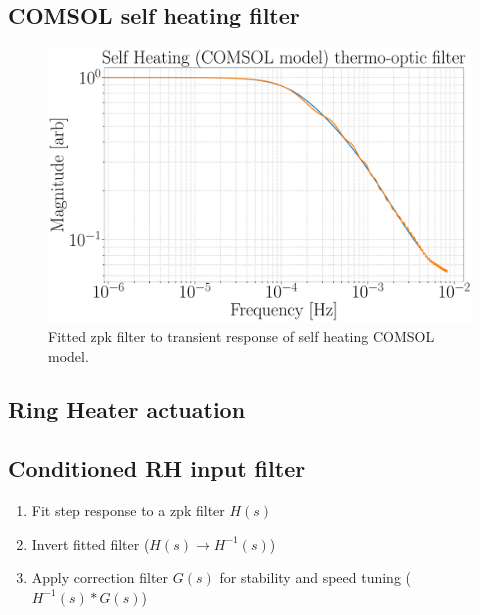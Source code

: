 \subsection{COMSOL self heating filter}
\begin{figure}[H]
\includegraphics[width=\textwidth]{figs/TCS/self_heating_zpk.pdf}
\caption{Fitted zpk filter to transient response of self heating COMSOL model.}
\label{fig:self_zpk_fit}
\end{figure}

\subsection{Ring Heater actuation}

\subsection{Conditioned RH input filter}
\begin{enumerate}	
	\item Fit step response to a zpk filter $H(s)$ 
	\item Invert fitted filter ($H(s) \rightarrow H^{-1}(s)$) 
	\item Apply correction filter $G(s)$ for stability and speed tuning ($H^{-1}(s)*G(s)$)
\end{enumerate}


